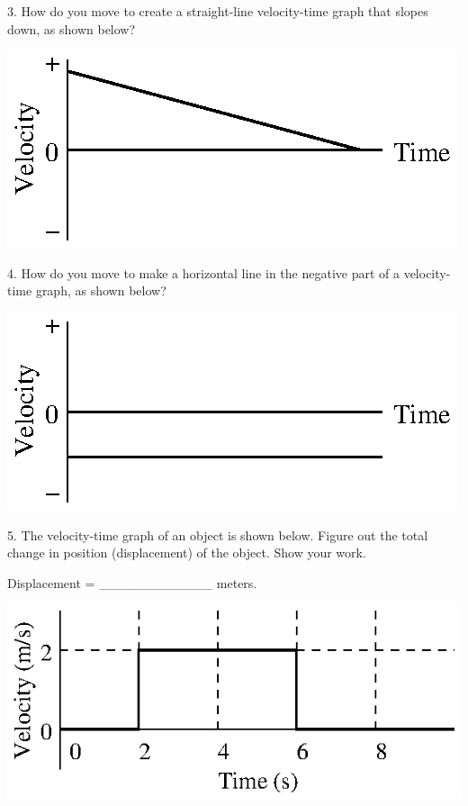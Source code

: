 3. How do you move to create a straight-line velocity-time graph that slopes
down, as shown below?

\vspace{0.3cm}
{\par\raggedright \includegraphics{velocity/velocity_fig10.eps} \par}
\vspace{0.3cm}

4. How do you move to make a horizontal line in the negative part of a velocity-time
graph, as shown below?

\vspace{0.3cm}
{\par\raggedright \includegraphics{velocity/velocity_fig11.eps} \par}
\vspace{0.3cm}

5. The velocity-time graph of an object is shown below. Figure out the total
change in position (displacement) of the object. Show your work.

Displacement = \_\_\_\_\_\_\_\_\_\_\_\_ meters.

\vspace{0.3cm}
{\par\raggedright \includegraphics{velocity/velocity_fig12.eps} \par}
\vspace{0.3cm}

